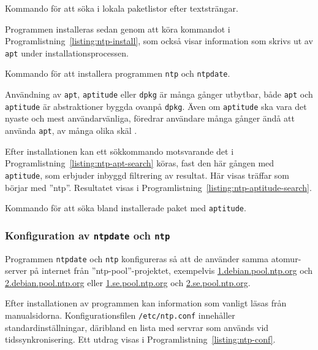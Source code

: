 \begin{listing}[H]
\caption{Kommando för att söka i lokala paketlistor efter textsträngar.}
\label{listing:ntp-apt-search}
\end{listing}


Programmen installeras sedan genom att köra kommandot i
Programlistning~\ref{listing:ntp-install}, som också visar information som skrivs
ut av \texttt{apt} under installationsprocessen.

\begin{listing}[H]
\caption{Kommando för att installera programmen \texttt{ntp} och \texttt{ntpdate}.}
\label{listing:ntp-install}
\end{listing}


Användning av \texttt{apt}, \texttt{aptitude} eller
\texttt{dpkg} är många gånger utbytbar, både \texttt{apt} och \texttt{aptitude}
är abstraktioner byggda ovanpå \texttt{dpkg}. Även om \texttt{aptitude} ska vara
det nyaste och mest användarvänliga, föredrar användare många gånger ändå
att använda \texttt{apt}, av många olika skäl \cite{superuser:aptitude-apt}.


Efter installationen kan ett sökkommando motsvarande det i
Programlistning~\ref{listing:ntp-apt-search} köras, fast den här gången med
\texttt{aptitude}, som erbjuder inbyggd filtrering av resultat. Här visas
träffar som börjar med ''ntp''. Resultatet visas i
Programlistning~\ref{listing:ntp-aptitude-search}.

\begin{listing}[H]
\caption{Kommando för att söka bland installerade paket med \texttt{aptitude}.}
\label{listing:ntp-aptitude-search}
\end{listing}


\subsubsection{Konfiguration av \texttt{ntpdate} och \texttt{ntp}}
Programmen \texttt{ntpdate} och \texttt{ntp} konfigureras så att de använder
samma atomur-server på internet från ''ntp-pool''-projektet, exempelvis
\url{1.debian.pool.ntp.org} och \url{2.debian.pool.ntp.org} eller
\url{1.se.pool.ntp.org} och \url{2.se.pool.ntp.org}.

Efter installationen av programmen kan information som vanligt läsas från
manualsidorna. Konfigurationsfilen \texttt{/etc/ntp.conf} innehåller
standardinställningar, däribland en lista med servrar som används vid
tidssynkronisering. Ett utdrag visas i Programlistning~\ref{listing:ntp-conf}.

